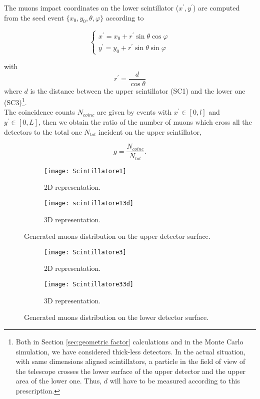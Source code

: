 The muons impact coordinates on the lower scintillator ($x^{'},y^{'}$) are computed from the seed event $\{x_0, y_0, \theta, \varphi \}$ according to

\begin{equation}
\begin{cases}
x^{'} = x_0 + r^{'} \sin \theta \cos \varphi   \\
y^{'} = y_0 + r^{'} \sin \theta \sin \varphi 
\end{cases}
\end{equation}

\noindent with
\begin{equation}
r^{'}= \frac{d}{\cos \theta}
\end{equation}
where $d$ is the distance between the upper scintillator (SC1) and the lower one (SC3)\footnote{Both in Section \ref{sec:geometric factor} calculations and in the Monte Carlo simulation, we have considered thick-less detectors. In the actual situation, with same dimensions aligned scintillators, a particle in the field of view of the telescope crosses the lower surface of the upper detector and the upper area of the lower one. Thus, $d$ will have to be measured according to this prescription.}.\\

The coincidence counts $N_{coinc}$ are given by events with $x^{'} \in [0,l]$ and $y^{'} \in [0,L]$, then we obtain the ratio of the number of muons which cross all the detectors to the total one $N_{tot}$ incident on the upper scintillator,

\begin{equation}
 g = \frac{N_{coinc}}{N_{tot}}.
\end{equation}

\begin{figure}[!htp]
	\centering
	\begin{subfigure}{.5\linewidth}
		\centering
		\texttt{[image: Scintillatore1]}
		\caption{2D representation.}
	\end{subfigure}\hfill
	\begin{subfigure}{.5\linewidth}
		\centering
		\texttt{[image: scintillatore13d]}
		\caption{3D representation.}
	\end{subfigure}
	\caption{Generated muons distribution on the upper detector surface.}
	\label{fig:upper}	
\end{figure}
\begin{figure}[!htp]
	\centering
	\begin{subfigure}{.5\linewidth}
		\centering
		\texttt{[image: Scintillatore3]}
		\caption{2D representation.}
	\end{subfigure}\hfill
	\begin{subfigure}{.5\linewidth}
		\centering
		\texttt{[image: Scintillatore33d]}
		\caption{3D representation.}
	\end{subfigure}
	\caption{Generated muons distribution on the lower detector surface.}
	\label{fig:lower}	
\end{figure}

